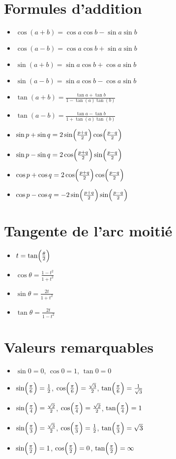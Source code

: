 \documentclass{yann}
\begin{document}
\section{Formules d'addition}

\begin{itemize}
\item
$\cos(a+b)       = \cos a \cos b - \sin a \sin b$
\item
$\cos(a-b)       = \cos a \cos b + \sin a \sin b$
\item
$\sin(a+b)       = \sin a \cos b + \cos a \sin b$
\item
$\sin(a-b)       = \sin a \cos b - \cos a \sin b$
\item
$\tan(a+b)       = \frac{\tan a + \tan b}{1 - \tan(a)\tan(b)}$
\item
$\tan(a-b)       = \frac{\tan a - \tan b}{1 + \tan(a)\tan(b)}$
\item
$\sin p + \sin q =  2 \sin\Bigl({\frac{p+q}{2}}\Bigr) \cos\Bigl({\frac{p-q}{2}}\Bigr)$
\item
$\sin p - \sin q =  2 \cos\Bigl({\frac{p+q}{2}}\Bigr) \sin\Bigl({\frac{p-q}{2}}\Bigr)$
\item
$\cos p + \cos q =  2 \cos\Bigl({\frac{p+q}{2}}\Bigr) \cos\Bigl({\frac{p-q}{2}}\Bigr)$
\item
$\cos p - \cos q = -2 \sin\Bigl({\frac{p+q}{2}}\Bigr) \sin\Bigl({\frac{p-q}{2}}\Bigr)$
\end{itemize}

\section{Tangente de l'arc moitié}

\begin{itemize}
\item
$t     = \tan\Bigl({\frac{\theta}{2}}\Bigr)$
\item
$\cos\theta = \frac{1-t^2}{1+t^2}$
\item
$\sin\theta = \frac{2t}{1+t^2}$
\item
$\tan\theta = \frac{2t}{1-t^2}$
\end{itemize}

\section{Valeurs remarquables}

\begin{itemize}
\item
$\sin 0 = 0$, $\cos 0 = 1$, $\tan 0 = 0$
\item
$\sin\Bigl({\frac\pi6}\Bigr) = \frac12$, $\cos\Bigl({\frac\pi6}\Bigr) = \frac{\sqrt3}{2}$, $\tan\Bigl({\frac\pi6}\Bigr) = \frac{1}{\sqrt3}$
\item
$\sin\Bigl({\frac\pi4}\Bigr) = \frac{\sqrt2}2$, $\cos\Bigl({\frac\pi4}\Bigr) = \frac{\sqrt2}{2}$, $\tan\Bigl({\frac\pi4}\Bigr) = 1$
\item
$\sin\Bigl({\frac\pi3}\Bigr) = \frac{\sqrt3}{2}$, $\cos\Bigl({\frac\pi3}\Bigr) = \frac12$, $\tan\Bigl({\frac\pi3}\Bigr) = \sqrt3$
\item
$\sin\Bigl({\frac\pi2}\Bigr) = 1$, $\cos\Bigl({\frac\pi2}\Bigr) = 0$, $\tan\Bigl({\frac\pi2}\Bigr) = \infty$
\end{itemize}
\end{document}
